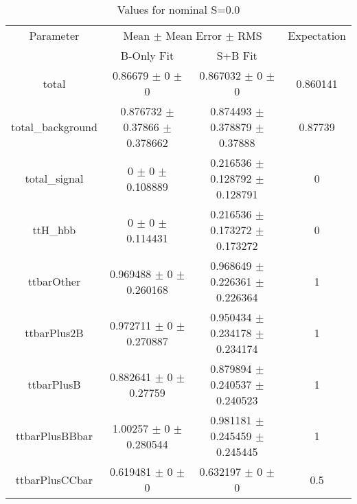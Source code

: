 \begin{table}
\centering
\caption{Values for nominal S=0.0}
\begin{tabular}{cccc}
\toprule
Parameter & \multicolumn{2}{c}{Mean $\pm$ Mean Error $\pm$ RMS} & Expectation\\
 & B-Only Fit & S+B Fit & \\
\midrule
total & \num{0.86679} $\pm$ \num{0} $\pm$ \num{0} & \num{0.867032} $\pm$ \num{0} $\pm$ \num{0} & \num{0.860141}\\
total\_background & \num{0.876732} $\pm$ \num{0.37866} $\pm$ \num{0.378662} & \num{0.874493} $\pm$ \num{0.378879} $\pm$ \num{0.37888} & \num{0.87739}\\
total\_signal & \num{0} $\pm$ \num{0} $\pm$ \num{0.108889} & \num{0.216536} $\pm$ \num{0.128792} $\pm$ \num{0.128791} & \num{0}\\
ttH\_hbb & \num{0} $\pm$ \num{0} $\pm$ \num{0.114431} & \num{0.216536} $\pm$ \num{0.173272} $\pm$ \num{0.173272} & \num{0}\\
ttbarOther & \num{0.969488} $\pm$ \num{0} $\pm$ \num{0.260168} & \num{0.968649} $\pm$ \num{0.226361} $\pm$ \num{0.226364} & \num{1}\\
ttbarPlus2B & \num{0.972711} $\pm$ \num{0} $\pm$ \num{0.270887} & \num{0.950434} $\pm$ \num{0.234178} $\pm$ \num{0.234174} & \num{1}\\
ttbarPlusB & \num{0.882641} $\pm$ \num{0} $\pm$ \num{0.27759} & \num{0.879894} $\pm$ \num{0.240537} $\pm$ \num{0.240523} & \num{1}\\
ttbarPlusBBbar & \num{1.00257} $\pm$ \num{0} $\pm$ \num{0.280544} & \num{0.981181} $\pm$ \num{0.245459} $\pm$ \num{0.245445} & \num{1}\\
ttbarPlusCCbar & \num{0.619481} $\pm$ \num{0} $\pm$ \num{0} & \num{0.632197} $\pm$ \num{0} $\pm$ \num{0} & \num{0.5}\\
\bottomrule
\end{tabular}
\end{table}